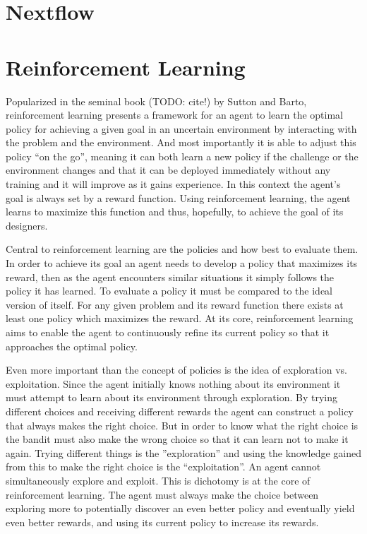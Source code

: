 \section{Nextflow}
\label{sec:nextflow}

\section{Reinforcement Learning}
\label{sec:rl}

Popularized in the seminal book (TODO: cite!) by Sutton and Barto, reinforcement learning presents a framework for an agent to learn the optimal policy for achieving a given goal in an uncertain environment by interacting with the problem and the environment. And most importantly it is able to adjust this policy ``on the go'', meaning it can both learn a new policy if the challenge or the environment changes and that it can be deployed immediately without any training and it will improve as it gains experience. In this context the agent's goal is always set by a reward function. Using reinforcement learning, the agent learns to maximize this function and thus, hopefully, to achieve the goal of its designers. 

Central to reinforcement learning are the policies and how best to evaluate them. In order to achieve its goal an agent needs to develop a policy that maximizes its reward, then as the agent encounters similar situations it simply follows the policy it has learned. To evaluate a policy it must be compared to the ideal version of itself. For any given problem and its reward function there exists at least one policy which maximizes the reward. At its core, reinforcement learning aims to enable the agent to continuously refine its current policy so that it approaches the optimal policy. 

Even more important than the concept of policies is the idea of exploration vs. exploitation. Since the agent initially knows nothing about its environment it must attempt  to learn about its environment through exploration. By trying different choices and receiving different rewards the agent can construct a policy that always makes the right choice. But in order to know what the right choice is the bandit must also make the wrong choice so that it can learn not to make it again. Trying different things is the ''exploration'' and using the knowledge gained from this to make the right choice is the ``exploitation''. An agent cannot simultaneously explore and exploit. This is dichotomy is at the core of reinforcement learning. The agent must always make the choice between exploring more to potentially discover an even better policy and eventually yield even better rewards, and using its current policy to increase its rewards. 

